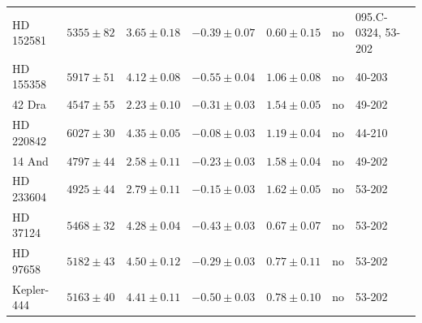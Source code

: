 \documentclass{aa}
\begin{document}
\begin{table}[htb!]
\begin{tabular}{lllllll}
    HD 152581     &  $5355 \pm  82$      &  $3.65 \pm 0.18$    &  $-0.39 \pm 0.07$    &  $0.60 \pm 0.15$             &             no              &  095.C-0324, 53-202                                                                                                      \\
    HD 155358     &  $5917 \pm  51$      &  $4.12 \pm 0.08$    &  $-0.55 \pm 0.04$    &  $1.06 \pm 0.08$             &             no              &  40-203                                                                                                                  \\
       42 Dra     &  $4547 \pm  55$      &  $2.23 \pm 0.10$    &  $-0.31 \pm 0.03$    &  $1.54 \pm 0.05$             &             no              &  49-202                                                                                                                  \\
    HD 220842     &  $6027 \pm  30$      &  $4.35 \pm 0.05$    &  $-0.08 \pm 0.03$    &  $1.19 \pm 0.04$             &             no              &  44-210                                                                                                                  \\
       14 And     &  $4797 \pm  44$      &  $2.58 \pm 0.11$    &  $-0.23 \pm 0.03$    &  $1.58 \pm 0.04$             &             no              &  49-202                                                                                                                  \\
    HD 233604     &  $4925 \pm  44$      &  $2.79 \pm 0.11$    &  $-0.15 \pm 0.03$    &  $1.62 \pm 0.05$             &             no              &  53-202                                                                                                                  \\
     HD 37124     &  $5468 \pm  32$      &  $4.28 \pm 0.04$    &  $-0.43 \pm 0.03$    &  $0.67 \pm 0.07$             &             no              &  53-202                                                                                                                  \\
     HD 97658     &  $5182 \pm  43$      &  $4.50 \pm 0.12$    &  $-0.29 \pm 0.03$    &  $0.77 \pm 0.11$             &             no              &  53-202                                                                                                                  \\
   Kepler-444     &  $5163 \pm  40$      &  $4.41 \pm 0.11$    &  $-0.50 \pm 0.03$    &  $0.78 \pm 0.10$             &             no              &  53-202                                                                                                                  \\

\end{tabular}
\end{table}
\end{document}
